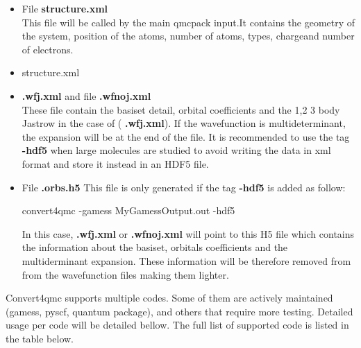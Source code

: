 \begin{itemize}
\begin{shade}
\end{shade}

 \item File \textbf{structure.xml} \\
 This file will be called by the main qmcpack input.It contains the geometry of the system, position of the atoms, number of atoms, types, chargeand number of electrons.
 \item structure.xml \\
 
 \item \textbf{.wfj.xml} and file \textbf{.wfnoj.xml}\\
 These file contain the basiset detail, orbital coefficients and the 1,2 3 body Jastrow in the case of (  \textbf{.wfj.xml}). If the wavefunction is multideterminant, the expansion will be at the end of the file. It is recommended to use the tag \textbf{-hdf5} when large molecules are studied to avoid writing the data in xml format and store it instead in an HDF5 file. 
 
 \item File \textbf{.orbs.h5}
 This file is only generated if the tag \textbf{-hdf5} is added as follow:
 \begin{shade}
  convert4qmc -gamess MyGamessOutput.out -hdf5
 \end{shade}
In this case,  \textbf{.wfj.xml} or \textbf{.wfnoj.xml} will point to this H5 file which contains the information about the basiset, orbitals coefficients and the multiderminant expansion. These information will be therefore removed from from the wavefunction files making them lighter. 

\end{itemize}


Convert4qmc supports multiple codes. Some of them are actively maintained (gamess, pyscf, quantum package), and others that require more testing. Detailed usage per code will be detailed bellow. The full list of supported code is listed in the table below.

